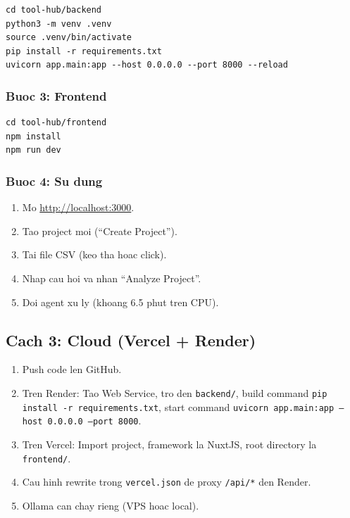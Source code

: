 \documentclass[12pt,a4paper]{article}
\begin{document}
\begin{lstlisting}[style=bash, language={}]
cd tool-hub/backend
python3 -m venv .venv
source .venv/bin/activate
pip install -r requirements.txt
uvicorn app.main:app --host 0.0.0.0 --port 8000 --reload
\end{lstlisting}

\subsubsection{Buoc 3: Frontend}

\begin{lstlisting}[style=bash, language={}]
cd tool-hub/frontend
npm install
npm run dev
\end{lstlisting}

\subsubsection{Buoc 4: Su dung}

\begin{enumerate}
  \item Mo \url{http://localhost:3000}.
  \item Tao project moi (``Create Project'').
  \item Tai file CSV (keo tha hoac click).
  \item Nhap cau hoi va nhan ``Analyze Project''.
  \item Doi agent xu ly (khoang 6.5 phut tren CPU).
\end{enumerate}

\subsection{Cach 3: Cloud (Vercel + Render)}

\begin{enumerate}
  \item Push code len GitHub.
  \item Tren Render: Tao Web Service, tro den \texttt{backend/},
        build command \texttt{pip install -r requirements.txt},
        start command \texttt{uvicorn app.main:app --host 0.0.0.0 --port 8000}.
  \item Tren Vercel: Import project, framework la NuxtJS,
        root directory la \texttt{frontend/}.
  \item Cau hinh rewrite trong \texttt{vercel.json} de proxy
        \texttt{/api/*} den Render.
  \item Ollama can chay rieng (VPS hoac local).
\end{enumerate}
\end{document}
